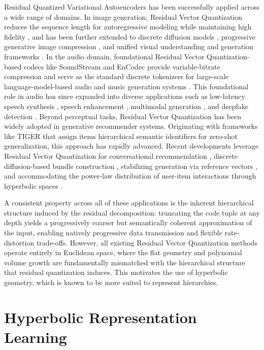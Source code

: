 \documentclass[12pt]{report}
\begin{document}
Residual Quantized Variational Autoencoders has been successfully applied across a wide range of domains. In image generation, Residual Vector Quantization reduces the sequence length for autoregressive modeling while maintaining high fidelity \cite{lee2022rqvae}, and has been further extended to discrete diffusion models \cite{resgen}, progressive generative image compression \cite{progic}, and unified visual understanding and generation frameworks \cite{evotok}. In the audio domain, foundational Residual Vector Quantization-based codecs like SoundStream \cite{soundstream} and EnCodec \cite{encodec} provide variable-bitrate compression and serve as the standard discrete tokenizers for large-scale language-model-based audio and music generation systems \cite{audiolm, musicgen}. This foundational role in audio has since expanded into diverse applications such as low-latency speech synthesis \cite{su2026ultralow}, speech enhancement \cite{li2026llsdr}, multimodal generation \cite{ye2026hierarchical}, and deepfake detection \cite{wu2026quantizer}. Beyond perceptual tasks, Residual Vector Quantization has been widely adopted in generative recommender systems. Originating with frameworks like TIGER \cite{tiger} that assign items hierarchical semantic identifiers for zero-shot generalization, this approach has rapidly advanced. Recent developments leverage Residual Vector Quantization for conversational recommendation \cite{talkplay}, discrete diffusion-based bundle construction \cite{ddbc}, stabilizing generation via reference vectors \cite{r3vae}, and accommodating the power-law distribution of user-item interactions through hyperbolic spaces \cite{hyprqvae_recsys}.

A consistent property across all of these applications is the inherent hierarchical structure induced by the residual decomposition: truncating the code tuple at any depth yields a progressively coarser but semantically coherent approximation of the input, enabling natively progressive data transmission and flexible rate-distortion trade-offs. However, all existing Residual Vector Quantization methods operate entirely in Euclidean space, where the flat geometry and polynomial volume growth are fundamentally mismatched with the hierarchical structure that residual quantization induces.
This motivates the use of hyperbolic geometry, which is known to be more suited to represent hierarchies. 

\section{Hyperbolic Representation Learning}
\label{sec:hyperbolic_repr}
\end{document}

